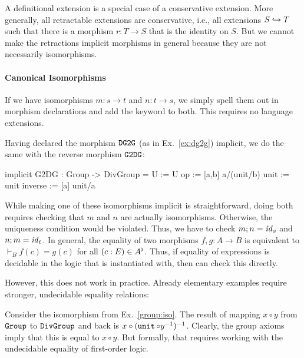 \begin{remark}
A definitional extension is a special case of a conservative extension.
More generally, all retractable extensions are conservative, i.e., all extensions $S\hookrightarrow T$ such that there is a morphism $r:T\to S$ that is the identity on $S$.
But we cannot make the retractions implicit morphisms in general because they are not necessarily isomorphisms.
\end{remark}

\paragraph{Canonical Isomorphisms}
If we have isomorphisms $m:s\to t$ and $n:t\to s$, we simply spell them out in morphism declarations and add the keyword  to both.
This requires no language extensions.

\begin{example}\label{group:iso}
Having declared the morphism $\operatorname{\mathtt{DG2G}}$ (as in Ex.~\ref{ex:dg2g}) implicit, we do the same with the reverse morphism  $\operatorname{\mathtt{G2DG}}$:
\begin{mmtcode}
implicit G2DG : Group -> DivGroup =
  U       := U
  op      := [a,b] a/(unit/b) 
  unit    := unit
  inverse := [a] unit/a
\end{mmtcode}
\end{example}

While making one of these isomorphisms implicit is straightforward, doing both requires checking that $m$ and $n$ are actually isomorphisms.
Otherwise, the uniqueness condition would be violated.
Thus, we have to check $m;n=\mathit{id}_{s}$ and $n;m=\mathit{id}_{t}$.
In general, the equality of two morphisms $f,g:A\to B$ is equivalent to $\vdash_B f(c)=g(c)$ for all $(c:E)\in A^\flat$.
Thus, if equality of expressions is decidable in the logic that \mmt is instantiated with, then \mmt can check this directly.

However, this does not work in practice.
Already elementary examples require stronger, undecidable equality relations:

\begin{example}
Consider the isomorphism from Ex.~\ref{group:iso}.
The result of mapping $x\circ y$ from $\operatorname{\mathtt{Group}}$ to $\operatorname{\mathtt{DivGroup}}$ and back is $x\circ(\operatorname{\mathtt{unit}}\circ y^{-1})^{-1}$.
Clearly, the group axioms imply that this is equal to $x\circ y$.
But formally, that requires working with the undecidable equality of first-order logic.
\end{example}

